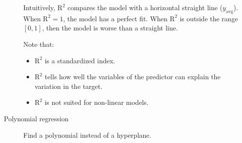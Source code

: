 \begin{description}
        Intuitively, $\text{R}^2$ compares the model with a horizontal straight line ($y_\text{avg}$).
        When $\text{R}^2 = 1$, the model has a perfect fit.
        When $\text{R}^2$ is outside the range $[0, 1]$, then the model is worse than a straight line.

        Note that:
        \begin{itemize}
            \item $\text{R}^2$ is a standardized index.
            \item $\text{R}^2$ tells how well the variables of the predictor can explain the variation in the target.
            \item $\text{R}^2$ is not suited for non-linear models.
        \end{itemize}

    \item[Polynomial regression] 
        Find a polynomial instead of a hyperplane.
\end{description}